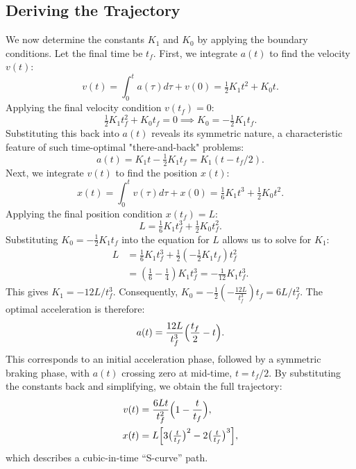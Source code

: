 \documentclass[journal,a4paper]{IEEEtran}
\begin{document}
\subsection{Deriving the Trajectory}
We now determine the constants $K_1$ and $K_0$ by applying the boundary conditions. Let the final time be $t_f$. First, we integrate $a(t)$ to find the velocity $v(t)$:
\begin{equation}
    v(t) = \int_0^t a(\tau) d\tau + v(0) = \tfrac{1}{2} K_1 t^2 + K_0 t.
\end{equation}
Applying the final velocity condition $v(t_f)=0$:
\begin{equation}
    \tfrac{1}{2} K_1 t_f^2 + K_0 t_f = 0 \implies K_0 = -\tfrac{1}{2} K_1 t_f.
\end{equation}
Substituting this back into $a(t)$ reveals its symmetric nature, a characteristic feature of such time-optimal "there-and-back" problems:
\begin{equation}
    a(t) = K_1 t - \tfrac{1}{2} K_1 t_f = K_1 (t - t_f/2).
\end{equation}
Next, we integrate $v(t)$ to find the position $x(t)$:
\begin{equation}
    x(t) = \int_0^t v(\tau) d\tau + x(0) = \tfrac{1}{6} K_1 t^3 + \tfrac{1}{2} K_0 t^2.
\end{equation}
Applying the final position condition $x(t_f)=L$:
\begin{equation}
    L = \tfrac{1}{6} K_1 t_f^3 + \tfrac{1}{2} K_0 t_f^2.
\end{equation}
Substituting $K_0 = -\frac{1}{2} K_1 t_f$ into the equation for $L$ allows us to solve for $K_1$:
\begin{align}
    L &= \tfrac{1}{6} K_1 t_f^3 + \tfrac{1}{2}(-\tfrac{1}{2}K_1 t_f)t_f^2 \nonumber\\
      &= (\tfrac{1}{6} - \tfrac{1}{4})K_1 t_f^3 = -\tfrac{1}{12} K_1 t_f^3.
\end{align}
This gives $K_1 = -12L/t_f^3$. Consequently, $K_0 = -\frac{1}{2}(-\frac{12L}{t_f^3})t_f = 6L/t_f^2$.
The optimal acceleration is therefore:
\begin{equation}
  a(t)=\frac{12L}{t_f^{3}}\Bigl(\frac{t_f}{2}-t\Bigr).
  \label{eq:a_linear}
\end{equation}
This corresponds to an initial acceleration phase, followed by a symmetric braking phase, with \(a(t)\) crossing zero at mid-time, \(t=t_f/2\). By substituting the constants back and simplifying, we obtain the full trajectory:
\begin{align}
  v(t) &= \frac{6Lt}{t_f^2}\Bigl(1-\frac{t}{t_f}\Bigr),
         \label{eq:v_free_corrected}\\
  x(t) &= L\Bigl[3\bigl(\tfrac{t}{t_f}\bigr)^{2}
                   -2\bigl(\tfrac{t}{t_f}\bigr)^{3}\Bigr],
         \label{eq:x_free}
\end{align}
which describes a cubic-in-time ``S-curve'' path.
\end{document}
